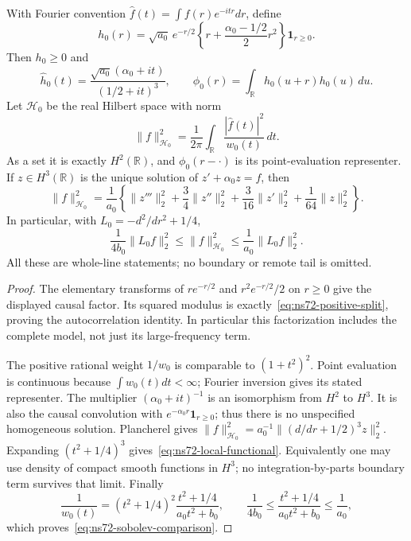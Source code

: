 \begin{proposition}
\label{prop:ns72-local-energy}
With Fourier convention $\widehat f(t)=\int f(r)e^{-itr}dr$, define
\[
 h_0(r)=\sqrt{a_0}\,e^{-r/2}
       \left\{r+\frac{\alpha_0-1/2}{2}r^2\right\}
       \mathbf1_{r\geq0}.
\]
Then $h_0\geq0$ and
\[
 \widehat h_0(t)=\frac{\sqrt{a_0}(\alpha_0+it)}{(1/2+it)^3},
 \qquad \phi_0(r)=\int_{\mathbb R}h_0(u+r)h_0(u)\,du.
\]
Let $\mathcal H_0$ be the real Hilbert space with norm
\[
 \|f\|_{\mathcal H_0}^2=
       \frac1{2\pi}\int_{\mathbb R}\frac{|\widehat f(t)|^2}{w_0(t)}\,dt.
\]
As a set it is exactly $H^2(\mathbb R)$, and $\phi_0(r-\cdot)$
is its point-evaluation representer. If $z\in H^3(\mathbb R)$ is the
unique solution of $z'+\alpha_0z=f$, then
\begin{equation}
 \|f\|_{\mathcal H_0}^2
 =\frac1{a_0}\left\{
 \|z'''\|_2^2+\frac34\|z''\|_2^2
               +\frac3{16}\|z'\|_2^2+\frac1{64}\|z\|_2^2\right\}.
 \label{eq:ns72-local-functional}
\end{equation}
In particular, with $L_0=-d^2/dr^2+1/4$,
\begin{equation}
 \frac1{4b_0}\|L_0f\|_2^2\leq\|f\|_{\mathcal H_0}^2
                 \leq\frac1{a_0}\|L_0f\|_2^2.
 \label{eq:ns72-sobolev-comparison}
\end{equation}
All these are whole-line statements; no boundary or remote tail is omitted.
\end{proposition}
\begin{proof}
The elementary transforms of $r e^{-r/2}$ and $r^2e^{-r/2}/2$ on
$r\geq0$ give the displayed causal factor. Its squared modulus is
exactly~\eqref{eq:ns72-positive-split}, proving the autocorrelation
identity. In particular this factorization includes the complete model,
not just its large-frequency term.

The positive rational weight $1/w_0$ is comparable to $(1+t^2)^2$.
Point evaluation is continuous because $\int w_0(t)dt<\infty$;
Fourier inversion gives its stated representer. The multiplier
$(\alpha_0+it)^{-1}$ is an isomorphism from $H^2$ to $H^3$.
It is also the causal convolution with
$e^{-\alpha_0r}\mathbf1_{r\geq0}$; thus there is no unspecified
homogeneous solution. Plancherel gives
$\|f\|_{\mathcal H_0}^2=a_0^{-1}\|(d/dr+1/2)^3z\|_2^2$.
Expanding $(t^2+1/4)^3$ gives~\eqref{eq:ns72-local-functional}.
Equivalently one may use density of compact smooth functions in $H^3$;
no integration-by-parts boundary term survives that limit.
Finally
\[
 \frac1{w_0(t)}=(t^2+1/4)^2\frac{t^2+1/4}{a_0t^2+b_0},
 \qquad \frac1{4b_0}\leq\frac{t^2+1/4}{a_0t^2+b_0}\leq\frac1{a_0},
\]
which proves~\eqref{eq:ns72-sobolev-comparison}.
\end{proof}

